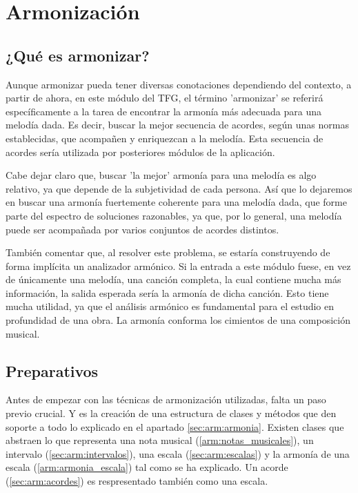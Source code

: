 \chapter{Armonización}
\label{cap:armonizacion}

\section{¿Qué es armonizar?}
\label{sec:arm:cuestion}    

    Aunque armonizar pueda tener diversas conotaciones dependiendo del contexto, a partir de ahora, en este módulo del TFG, el término 'armonizar' se referirá específicamente a la tarea de encontrar la armonía más adecuada para una melodía dada. Es decir, buscar la mejor secuencia de acordes, según unas normas establecidas, que acompañen y enriquezcan a la melodía. Esta secuencia de acordes sería utilizada por posteriores módulos de la aplicación.

    Cabe dejar claro que, buscar 'la mejor' armonía para una melodía es algo relativo, ya que depende de la subjetividad de cada persona. Así que lo dejaremos en buscar una armonía fuertemente coherente para una melodía dada, que forme parte del espectro de soluciones razonables, ya que, por lo general, una melodía puede ser acompañada por varios conjuntos de acordes distintos.

    También comentar que, al resolver este problema, se estaría construyendo de forma implícita un analizador armónico. Si la entrada a este módulo fuese, en vez de únicamente una melodía, una canción completa, la cual contiene mucha más información, la salida esperada sería la armonía de dicha canción. Esto tiene mucha utilidad, ya que el análisis armónico es fundamental para el estudio en profundidad de una obra. La armonía conforma los cimientos de una composición musical. 

    \section{Preparativos}

    Antes de empezar con las técnicas de armonización utilizadas, falta un paso previo crucial. Y es la creación de una estructura de clases y métodos que den soporte a todo lo explicado en el apartado \ref{sec:arm:armonia}. Existen clases que abstraen lo que representa una nota musical (\ref{arm:notas_musicales}), un intervalo (\ref{sec:arm:intervalos}), una escala (\ref{sec:arm:escalas}) y la armonía de una escala (\ref{arm:armonia_escala}) tal como se ha explicado. Un acorde (\ref{sec:arm:acordes}) es respresentado también como una escala. 
    
